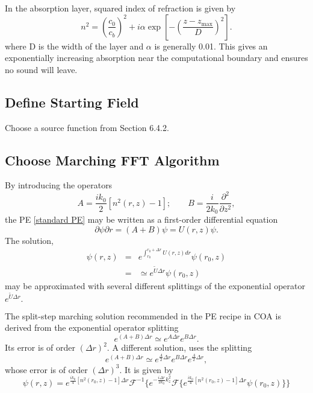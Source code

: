 \documentclass[12pt]{article}
\begin{document}
In the absorption layer, squared index of refraction is given by 
\begin{equation}
	n^2 = \left(\frac{c_0}{c_b}\right)^2 + i\alpha \exp \left[ - \left(\frac{z-z_\text{max}}{D}\right)^2 \right].
\end{equation}
where D is the width of the layer and $\alpha$ is generally 0.01. This
gives an exponentially increasing absorption near the computational
boundary and ensures no sound will leave.

\subsection{Define Starting Field}
Choose a source function from Section 6.4.2. 

\subsection{Choose Marching FFT Algorithm}
By introducing the operators
\begin{equation}
A = \frac{ik_0}{2}[n^2(r,z) - 1]; \qquad 
B = \frac{i}{2k_0} \frac{\partial^2}{\partial z^2},
\end{equation} 
the PE \eqref{standard PE} may be written as a first-order differential equation
\begin{equation}
{\partial \psi}{\partial r} = (A + B)\psi = U(r,z)\psi.
\end{equation}
The solution,
\begin{eqnarray}
\psi(r,z) & = & e^{\int_{r_0}^{r_0 + \Delta r} U(r,z)dr} \psi(r_0,z) \nonumber \\
& = & \simeq e^{\widetilde{U}\Delta r} \psi(r_0,z)  
\end{eqnarray}
may be approximated with several different splittings of the exponential
operator $e^{\widetilde{U}\Delta r}. $

The split-step marching solution recommended in the PE recipe in COA is
derived from the exponential operator splitting
	\begin{equation}
		e^{(A + B)\Delta r} \simeq e^{A\Delta r} e^{B\Delta r}.
	\end{equation}
Its error is of order $(\Delta r)^2$.  A different solution,
uses the splitting 
	\begin{equation}
		e^{(A + B)\Delta r} \simeq e^{\frac{A}{2} \Delta r} e^{B \Delta r} e^{\frac{A}{2} \Delta r},
	\end{equation}
whose error is of order $(\Delta r)^3$.  It is given by
	\begin{equation}
		\psi(r,z) = e^{\frac{ik_0}{4}[n^2(r_0,z)-1]\Delta r} \mathcal{F}^{-1} 
			\Big\{
				e^{-\frac{i \Delta r}{2k_0}k_z^2} \mathcal{F} 
				\Big\{
					e^{\frac{ik_0}{4}[n^2(r_0,z)-1]\Delta r} \psi(r_0,z)
				\Big\}
			\Big\} \label{spltstpmarch}
	\end{equation}
	
\end{document}
